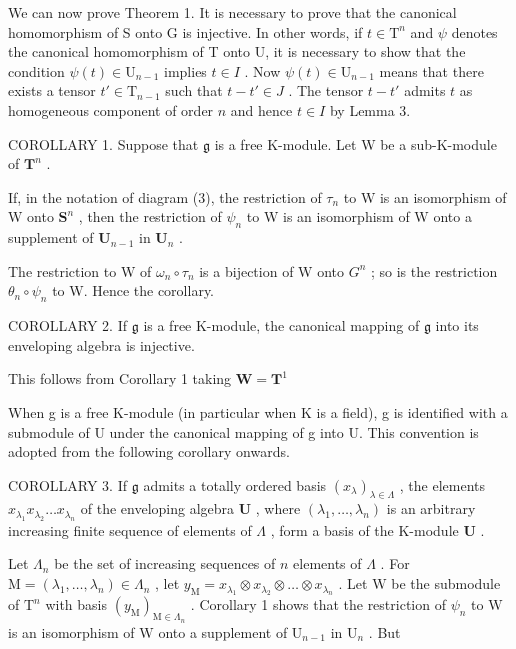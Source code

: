 We can now prove Theorem 1. It is necessary to prove that the canonical homomorphism of S onto G is injective. In other words, if \(t \in \mathrm{T}^n\) and \(\psi\) denotes the canonical homomorphism of T onto U, it is necessary to show that the condition \(\psi(t) \in \mathrm{U}_{n-1}\) implies \(t \in I\) . Now \(\psi(t) \in \mathrm{U}_{n-1}\) means that there exists a tensor \(t' \in \mathrm{T}_{n-1}\) such that \(t - t' \in J\) . The tensor \(t - t'\) admits \(t\) as homogeneous component of order \(n\) and hence \(t \in I\) by Lemma 3.

COROLLARY 1. Suppose that \(\mathfrak{g}\) is a free K-module. Let W be a sub-K-module of \(\mathbf{T}^n\) .

If, in the notation of diagram (3), the restriction of \(\tau_{n}\) to W is an isomorphism of W onto \(\mathbf{S}^n\) , then the restriction of \(\psi_{n}\) to W is an isomorphism of W onto a supplement of \(\mathbf{U}_{n-1}\) in \(\mathbf{U}_n\) .

The restriction to W of \(\omega_{n} \circ \tau_{n}\) is a bijection of W onto \(G^{n}\) ; so is the restriction \(\theta_{n} \circ \psi_{n}\) to W. Hence the corollary.

COROLLARY 2. If \(\mathfrak{g}\) is a free K-module, the canonical mapping of \(\mathfrak{g}\) into its enveloping algebra is injective.

This follows from Corollary 1 taking \(\mathbf{W} = \mathbf{T}^1\)

When g is a free K-module (in particular when K is a field), g is identified with a submodule of U under the canonical mapping of g into U. This convention is adopted from the following corollary onwards.

COROLLARY 3. If \(\mathfrak{g}\) admits a totally ordered basis \((x_{\lambda})_{\lambda \in \Lambda}\) , the elements \(x_{\lambda_1}x_{\lambda_2}\ldots x_{\lambda_n}\) of the enveloping algebra \(\mathbf{U}\) , where \((\lambda_1,\dots ,\lambda_n)\) is an arbitrary increasing finite sequence of elements of \(\Lambda\) , form a basis of the K-module \(\mathbf{U}\) .

Let \(\Lambda_{n}\) be the set of increasing sequences of \(n\) elements of \(\Lambda\) . For \(\mathrm{M} = (\lambda_1, \ldots, \lambda_n) \in \Lambda_n\) , let \(y_{\mathrm{M}} = x_{\lambda_1} \otimes x_{\lambda_2} \otimes \dots \otimes x_{\lambda_n}\) . Let \(\mathrm{W}\) be the submodule of \(\mathrm{T}^n\) with basis \((y_{\mathrm{M}})_{\mathrm{M} \in \Lambda_n}\) . Corollary 1 shows that the restriction of \(\psi_n\) to \(\mathrm{W}\) is an isomorphism of \(\mathrm{W}\) onto a supplement of \(\mathrm{U}_{n-1}\) in \(\mathrm{U}_n\) . But

